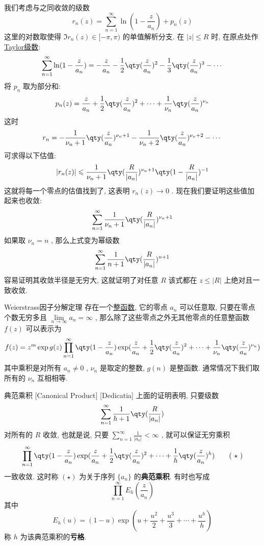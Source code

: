 \documentclass[UTF8]{ctexart}
\begin{document}
\begin{prf}
    我们考虑与之同收敛的级数
    \[r_n(z)=\sum_{n=1}^{\infty}\ln(1-\frac{z}{a_n})+p_n(z)\]
    这里的对数取使得 \( \Im r_n(z)\in[-\pi,\pi) \) 的单值解析分支. 在 \( |z|\leqslant R \) 时, 在原点处作\hyperref[thm:TaylorSeries]{Taylor级数}:
    \[\sum_{n=1}^{\infty}\ln(1-\frac{z}{a_n})=-\frac{z}{a_n}-\frac{1}{2}\qty(\frac{z}{a_n})^2-\frac{1}{3}\qty(\frac{z}{a_n})^3-\cdots\]
    将 \( p_n \) 取为部分和: 
    \[p_n(z)=\frac{z}{a_n}+\frac{1}{2}\qty(\frac{z}{a_n})^2+\cdots+\frac{1}{\nu_n}\qty(\frac{z}{a_n})^{\nu_n}\]
    这时
    \[r_n=-\frac{1}{\nu_n+1}\qty(\frac{z}{a_n})^{\nu_n+1}-\frac{1}{\nu_n+2}\qty(\frac{z}{a_n})^{\nu_n+2}-\cdots\]
    可求得以下估值: 
    \[|r_n(z)|\leqslant\frac{1}{\nu_n+1}\qty(\frac{R}{|a_n|})^{\nu_n+1}\qty(1-\frac{R}{|a_n|})^{-1} \]
    这就将每一个零点的估值找到了, 这表明 \( r_n(z)\to 0 \) . 现在我们要证明这些值加起来也收敛: 
    \[\sum_{n=1}^{\infty}\frac{1}{\nu_n+1}\qty(\frac{R}{|a_n|})^{\nu_n+1}\]
    如果取 \( \nu_n=n \) , 那么上式变为幂级数
    \[\sum_{n=1}^{\infty}\frac{1}{n+1}\qty(\frac{R}{|a_n|})^{n+1}\]
    容易证明其收敛半径是无穷大, 这就证明了对任意 \( R \) 该式都在 \( z\leq|R| \) 上绝对且一致收敛. 
\end{prf}
\begin{thm}
    {Weierstrass因子分解定理}
    存在一个\hyperref[dfn:EntireFunction]{整函数}, 它的零点 \( a_n \) 可以任意取, 只要在零点个数无穷多且 \( \lim\limits_{n\to\infty }a_n=\infty \) , 那么除了这些零点之外无其他零点的任意整函数 \( f(z) \) 可以表示为
    \[f(z)=z^m\exp g(z)\prod_{n=1}^{\infty}\qty(1-\frac{z}{a_n})\exp(\frac{z}{a_n}+\frac{1}{2}\qty(\frac{z}{a_n})^2+\cdots+\frac{1}{\nu_n}\qty(\frac{z}{a_n})^{\nu_n})\]
    其中乘积是对所有 \( a_n\neq 0 \) ,  \( \nu_n \) 是取定的整数,  \( g(n) \) 是整函数. 通常情况下我们取所有的 \( \nu_n \) 互相相等. 
\end{thm}
\begin{dfn}
    [CanonicalProduct]
    {典范乘积}
    [Canonical Product]
    [Dedicatia]
    上面的证明表明, 只要级数
    \[\sum_{n=1}^{\infty}\frac{1}{h+1}\qty(\frac{R}{|a_n|})\]
    对所有的 \( R \) 收敛, 也就是说, 只要 \( \sum\limits_{n=1}^{\infty}\frac{1}{|a_n|}<\infty \) , 就可以保证无穷乘积
    \[\prod_{n=1}^{\infty}\qty(1-\frac{z}{a_n})\exp(\frac{z}{a_n}+\frac{1}{2}\qty(\frac{z}{a_n})^2+\cdots+\frac{1}{h}\qty(\frac{z}{a_n})^{h})\tag{ \( \star \) }\]
    一致收敛. 这时称 \( (\star) \) 为关于序列 \( \{a_n\} \) 的\textbf{典范乘积}. 有时也写成
    \[\prod_{n=1}^{\infty}E_h(\frac{z}{a_n})\]
    其中
    \[E_h(u)=(1-u)\exp(u+\frac{u^2}{2}+\frac{u^3}{3}+\cdots+\frac{u^h}{h})\]
    称 \( h \) 为该典范乘积的\textbf{亏格}.
\end{dfn}
\end{document}
